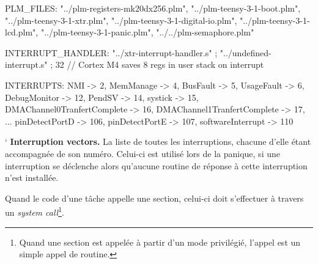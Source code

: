 
\begin{PLM}
PLM_FILES:
  "../plm-registers-mk20dx256.plm",
  "../plm-teensy-3-1-boot.plm",
  "../plm-teensy-3-1-xtr.plm",
  "../plm-teensy-3-1-digital-io.plm",
  "../plm-teensy-3-1-lcd.plm",
  "../plm-teensy-3-1-panic.plm",
  "../../plm-semaphore.plm"
\end{PLM}









\begin{PLM}
INTERRUPT_HANDLER:
  "../xtr-interrupt-handler.s" ;
  "../undefined-interrupt.s" ;
  32 // Cortex M4 saves 8 regs in user stack on interrupt
\end{PLM}









\begin{PLM}
INTERRUPTS:
  NMI -> 2,
  MemManage -> 4,
  BusFault -> 5,
  UsageFault -> 6,
  DebugMonitor -> 12,
  PendSV -> 14,
  systick -> 15,
  DMAChannel0TranfertComplete -> 16,
  DMAChannel1TranfertComplete -> 17,
  ...
  pinDetectPortD -> 106,
  pinDetectPortE -> 107,
  softwareInterrupt -> 110
\end{PLM}







`
{\bf Interruption vectors.} La liste de toutes les interruptions, chacune d'elle étant accompagnée de son numéro. Celui-ci est utilisé lors de la panique, si une interruption se déclenche alors qu'aucune routine de réponse à cette interruption n'est installée.







Quand le code d'une tâche appelle une section, celui-ci doit s'effectuer à travers un \emph{system call}\footnote{Quand une section est appelée à partir d'un mode privilégié, l'appel est un simple appel de routine.}.

